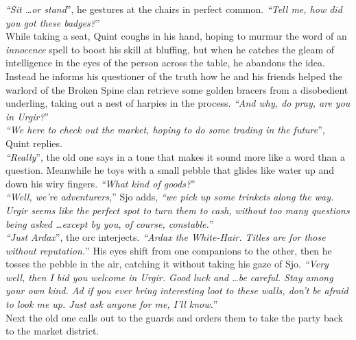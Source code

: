 {\itshape``Sit \ldots or stand}'', he gestures at the chairs in perfect common. {\itshape``Tell me, how did you got these badges?}''\\

While taking a seat, Quint coughs in his hand, hoping to murmur the word of an {\itshape innocence} spell to boost his skill at bluffing, but when he catches the gleam of intelligence in the eyes of the person across the table, he abandons the idea. Instead he informs his questioner of the truth how he and his friends helped the warlord of the Broken Spine clan retrieve some golden bracers from a disobedient underling, taking out a nest of harpies in the process. {\itshape``And why, do pray, are you in Urgir?}''\\

{\itshape``We here to check out the market, hoping to do some trading in the future}'', Quint replies.\\

{\itshape``Really}'', the old one says in a tone that makes it sound more like a word than a question. Meanwhile he toys with a small pebble that glides like water up and down his wiry fingers. {\itshape``What kind of goods?}''\\

{\itshape``Well, we're adventurers,}'' Sjo adds, {\itshape``we pick up some trinkets along the way. Urgir seems like the perfect spot to turn them to cash, without too many questions being asked \ldots except by you, of course, constable.}''\\

{\itshape``Just Ardax}'', the orc interjects. {\itshape``Ardax the White-Hair. Titles are for those without reputation.}'' His eyes shift from one companions to the other, then he tosses the pebble in the air, catching it without taking his gaze of Sjo. {\itshape``Very well, then I bid you welcome in Urgir. Good luck and \ldots be careful. Stay among your own kind. Ad if you ever bring interesting loot to these walls, don't be afraid to look me up. Just ask anyone for me, I'll know.}''\\

Next the old one calls out to the guards and orders them to take the party back to the market district.\\

